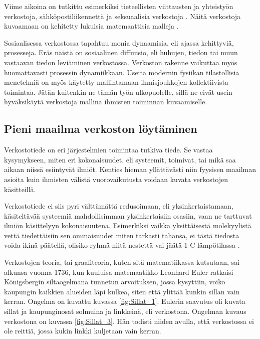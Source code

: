 \documentclass[finnish,12pt,a4paper,pdftex,elec,utf8]{aaltothesis}
\begin{document}
Viime aikoina on tutkittu esimerkiksi tieteellisten viittausten ja yhteistyön verkostoja, \cite{Fractal-dimension} sähköpostiliikennettä \cite{Self-similar-community} ja seksuaalisia verkostoja \cite{The-web-of-human-sexual-contacts}. Näitä verkostoja kuvaamaan on kehitetty lukuisia matemaattisia malleja \cite{The-rise-and-fall}.

Sosiaalisessa verkostossa tapahtuu monia dynaamisia, eli ajassa kehittyviä, prosesseja. Eräs näistä on sosiaalinen diffuusio, eli huhujen, tiedon tai muun vastaavan tiedon leviäminen verkostossa. Verkoston rakenne vaikuttaa myös huomattavasti prosessin dynamiikkaan. Useita modernin fysiikan tilastollisia menetelmiä on myös käytetty mallintamaan ihmisjoukkojen kollektiivista toimintaa. \cite{sosiaalifysiikka} Jätän kuitenkin ne tämän työn ulkopuolelle, sillä ne eivät usein hyväksikäytä verkostoja mallina ihmisten toiminnan kuvaamiselle.

\subsection{Pieni maailma verkoston löytäminen}

Verkostotiede on eri järjestelmien toimintaa tutkiva tiede. Se vastaa kysymykseen, miten eri kokonaisuudet, eli systeemit, toimivat, tai mikä saa aikaan niissä esiintyvät ilmiöt. Kenties hieman yllättävästi niin fyysisen maailman asioita kuin ihmisten välistä vuorovaikutusta voidaan kuvata verkostojen käsitteillä. \cite[15]{Nexus}

Verkostotiede ei siis pyri välttämättä redusoimaan, eli yksinkertaistamaan, käsiteltävää systeemiä mahdollisimman yksinkertaisiin osasiin, vaan ne tarttuvat ilmiön käsittelyyn kokonaisuutena. Esimerkiksi vaikka yksittäisestä molekyylistä vettä tiedettäisiin sen ominaisuudet miten tarkasti tahansa, ei tästä tiedosta voida ikinä päätellä, olisiko ryhmä niitä nestettä vai jäätä 1 \degree C lämpötilassa \cite[15]{Nexus}.

Verkostojen teoria, tai graafiteoria, kuten sitä matematiikassa kutsutaan, sai alkunsa vuonna 1736, kun kuuluisa matemaatikko Leonhard Euler ratkaisi Königsbergin siltaogelmana tunnetun arvoituksen, jossa kysyttiin, voiko kaupungin kaikkien alueiden läpi kulkea, siten että ylittää kunkin sillan vain kerran. Ongelma on kuvattu kuvassa \ref{fig:Sillat_1}. Eulerin saavutus oli kuvata sillat ja kaupunginosat solmuina ja linkkeinä, eli verkostona. Ongelman kuvaus verkostona on kuvassa \ref{fig:Sillat_3}. Hän todisti niiden avulla, että verkostossa ei ole reittiä, jossa kukin linkki kuljetaan vain kerran. \cite[17]{Linkit}
\end{document}
